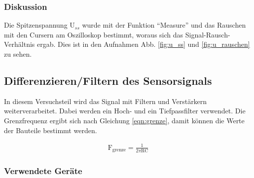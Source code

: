 \documentclass[12pt,a4paper]{article}
\begin{document}
\subsubsection*{Diskussion}
Die Spitzenspannung U$_{ss}$ wurde mit der Funktion "`Measure"' und das Rauschen mit den Cursern am Oszilloskop bestimmt, woraus sich das Signal-Rausch-Verhältnis ergab. Dies ist in den Aufnahmen Abb. \ref{fig:u_ss} und \ref{fig:u_rauschen} zu sehen. 
\subsection{Differenzieren/Filtern des Sensorsignals}
In diesem Versuchsteil wird das Signal mit Filtern und Verstärkern weiterverarbeitet. Dabei werden ein Hoch- und ein Tiefpassfilter verwendet. Die Grenzfrequenz ergibt sich nach Gleichung \ref{eqn:grenze}, damit können die Werte der Bauteile bestimmt werden.

\begin{align}
\text{F}_\text{grenze}=\frac{1}{2 \pi \text{RC}}
\label{eqn:grenze}
\end{align}
\subsubsection*{Verwendete Geräte}
\end{document}
